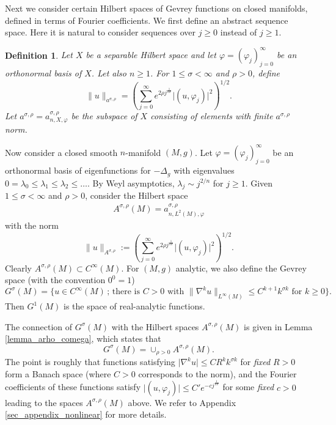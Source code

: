 \documentclass[12pt,twoside]{amsart}
\numberwithin{equation}{section}
\renewcommand{\leq}{\leqslant}
\renewcommand{\geq}{\geqslant}
\newtheorem{definition}[theorem]{Definition}
\newcommand{\abs}[1]{\lvert #1 \rvert}          %
\newcommand{\norm}[1]{\lVert #1 \rVert}         %
\begin{document}
Next we consider certain Hilbert spaces of Gevrey functions on closed manifolds, defined in terms of Fourier coefficients. We first define an abstract sequence space. Here it is natural to consider sequences over $j \geq 0$ instead of $j \geq 1$.

\begin{definition} \label{def_asigmarho_sequence}
Let $X$ be a separable Hilbert space and let $\varphi = (\varphi_j)_{j=0}^{\infty}$ be an orthonormal basis of $X$. Let also $n \geq 1$. For $1 \leq \sigma < \infty$ and $\rho > 0$, define 
\[
\norm{u}_{a^{\sigma,\rho}} = \left( \sum_{j=0}^{\infty} e^{2\rho j^{\frac{1}{n \sigma}}} \abs{(u, \varphi_j)}^2 \right)^{1/2}.
\]
Let $a^{\sigma,\rho} = a^{\sigma,\rho}_{n,X,\varphi}$ be the subspace of $X$ consisting of elements with finite $a^{\sigma,\rho}$ norm.
\end{definition}

Now consider a closed smooth $n$-manifold $(M,g)$. Let $\varphi = (\varphi_j)_{j=0}^{\infty}$ be an orthonormal basis of eigenfunctions for $-\Delta_g$ with eigenvalues $0 = \lambda_0 \leq  \lambda_1 \leq \lambda_2 \leq \ldots$. By Weyl asymptotics, $\lambda_j \sim j^{2/n}$ for $j \geq 1$. Given $1 \leq \sigma < \infty$ and $\rho > 0$, consider the Hilbert space 
\begin{align}
\label{eq:Asr}
A^{\sigma,\rho}(M) = a^{\sigma,\rho}_{n,L^2(M), \varphi}
\end{align}
with the norm 
\[
\norm{u}_{A^{\sigma,\rho}} := (\sum_{j=0}^{\infty} e^{2\rho j^{\frac{1}{n \sigma}}} \abs{(u,\varphi_j)}^2 )^{1/2}.
\]
Clearly $A^{\sigma, \rho}(M) \subset C^{\infty}(M)$. For $(M,g)$ analytic, we also define the Gevrey space (with the convention $0^0 = 1$) 
\[
G^{\sigma}(M) = \{ u \in C^{\infty}(M) \,;\, \text{there is $C > 0$ with $\norm{\nabla^k u}_{L^{\infty}(M)} \leq C^{k+1} k^{\sigma k}$ for $k \geq 0$} \}.
\]
Then $G^1(M)$ is the space of real-analytic functions.

The connection of $G^{\sigma}(M)$ with the Hilbert spaces $A^{\sigma,\rho}(M)$ is given in Lemma \ref{lemma_arho_comega}, which states that 
\[
G^{\sigma}(M) = \cup_{\rho > 0} A^{\sigma,\rho}(M).
\]
The point is roughly that functions satisfying $\abs{\nabla^k u} \leq C R^k k^{\sigma k}$ for \emph{fixed} $R > 0$ form a Banach space (where $C > 0$ corresponds to the norm), and the Fourier coefficients of these functions satisfy $\abs{(u,\varphi_j)} \leq C' e^{-c j^{\frac{1}{n\sigma}}}$ for some \emph{fixed} $c > 0$ leading to the spaces $A^{\sigma,\rho}(M)$ above. We refer to Appendix \ref{sec_appendix_nonlinear} for more details.
\end{document}
